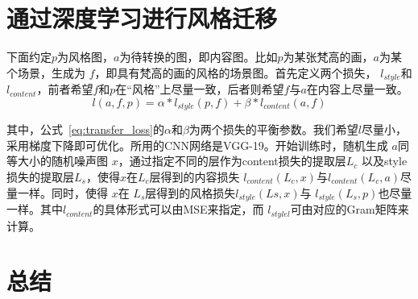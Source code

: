 \section{通过深度学习进行风格迁移}

下面约定$p$为风格图，$a$为待转换的图，即内容图。比如$p$为某张梵高的画，$a$为某个场景，生成为 $f$，即具有梵高的画的风格的场景图。首先定义两个损失， $l_{style}$和$l_{content}$，前者希望$f$和$p$在“风格”上尽量一致，后者则希望$f$与$a$在内容上尽量一致。
\begin{equation}
\label{eq:transfer_loss}
  l(a,f,p)=\alpha \ast l_{style}(p,f) + \beta \ast l_{content}(a,f)
\end{equation}

其中，公式~\ref{eq:transfer_loss}的$\alpha$和$\beta$为两个损失的平衡参数。我们希望$l$尽量小，采用梯度下降即可优化。所用的CNN网络是VGG-19。开始训练时，随机生成 $a$同等大小的随机噪声图 $x$，通过指定不同的层作为content损失的提取层$L_c$ 以及style损失的提取层$L_s$，使得$x$在$L_c$层得到的内容损失 $l_{content}(L_c,x)$与$l_{content}(L_c,a)$尽量一样。同时，使得 $x$在 $L_s$层得到的风格损失$l_{style}(Ls,x)$与 $l_{style}(L_s,p)$也尽量一样。其中$l_{content}$的具体形式可以由MSE来指定，而 $l_{stylel}$可由对应的Gram矩阵来计算。

\section{总结}



